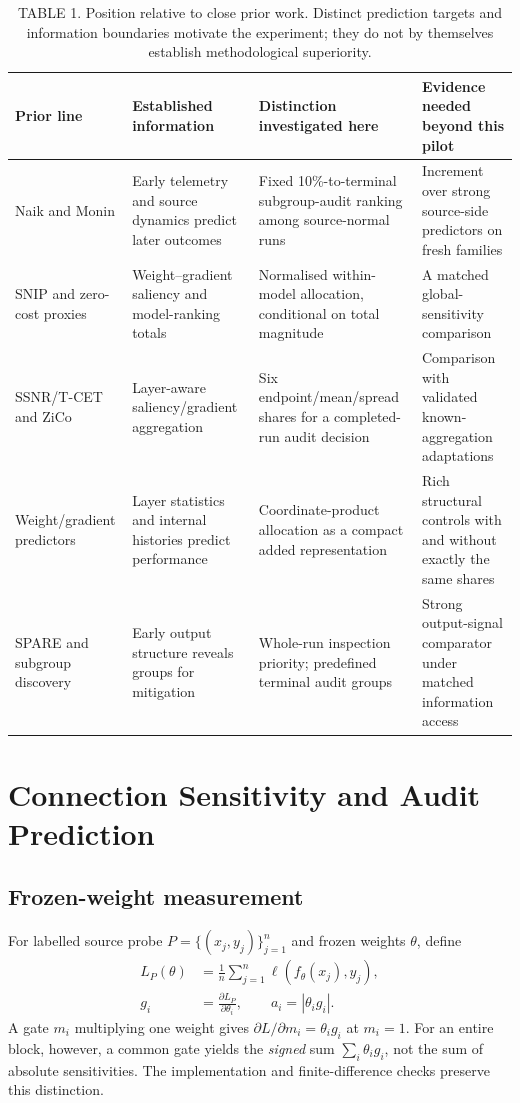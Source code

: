 \begin{table}[t]
\caption{TABLE 1. Position relative to close prior work. Distinct prediction targets and information boundaries motivate the experiment; they do not by themselves establish methodological superiority.}
\label{tab:position}
\centering\small
\begin{tabular}{llll}
\toprule Prior line & Established information & Distinction investigated here & Evidence needed beyond this pilot\\\midrule
Naik and Monin & Early telemetry and source dynamics predict later outcomes & Fixed 10\%-to-terminal subgroup-audit ranking among source-normal runs & Increment over strong source-side predictors on fresh families\\
SNIP and zero-cost proxies & Weight--gradient saliency and model-ranking totals & Normalised within-model allocation, conditional on total magnitude & A matched global-sensitivity comparison\\
SSNR/T-CET and ZiCo & Layer-aware saliency/gradient aggregation & Six endpoint/mean/spread shares for a completed-run audit decision & Comparison with validated known-aggregation adaptations\\
Weight/gradient predictors & Layer statistics and internal histories predict performance & Coordinate-product allocation as a compact added representation & Rich structural controls with and without exactly the same shares\\
SPARE and subgroup discovery & Early output structure reveals groups for mitigation & Whole-run inspection priority; predefined terminal audit groups & Strong output-signal comparator under matched information access\\\bottomrule
\end{tabular}
\end{table}

\section{Connection Sensitivity and Audit Prediction}
\label{sec:method}
\subsection{Frozen-weight measurement}
For labelled source probe $P=\{(x_j,y_j)\}_{j=1}^{n}$ and frozen weights $\theta$, define
\begin{equation}
\begin{aligned}
L_P(\theta)&=\frac1n\sum_{j=1}^{n}\ell(f_\theta(x_j),y_j),\\
g_i&=\frac{\partial L_P}{\partial\theta_i},\qquad a_i=|\theta_i g_i|.
\end{aligned}
\label{eq:sensitivity}
\tag{1}\end{equation}
A gate $m_i$ multiplying one weight gives $\partial L/\partial m_i=\theta_i g_i$ at $m_i=1$. For an entire block, however, a common gate yields the \emph{signed} sum $\sum_i\theta_i g_i$, not the sum of absolute sensitivities. The implementation and finite-difference checks preserve this distinction.

